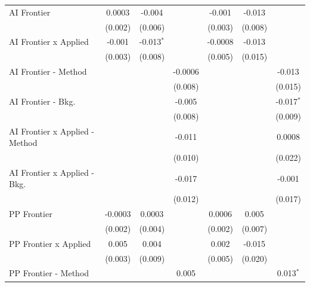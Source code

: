 \begin{tabular}{lcccccc}
   AI Frontier                    & 0.0003      & -0.004       &              & -0.001      & -0.013        &   \\   
                                  & (0.002)     & (0.006)      &              & (0.003)     & (0.008)       &   \\   
   AI Frontier x Applied          & -0.001      & -0.013$^{*}$ &              & -0.0008     & -0.013        &   \\   
                                  & (0.003)     & (0.008)      &              & (0.005)     & (0.015)       &   \\   
   AI Frontier - Method           &             &              & -0.0006      &             &               & -0.013\\   
                                  &             &              & (0.008)      &             &               & (0.015)\\   
   AI Frontier - Bkg.             &             &              & -0.005       &             &               & -0.017$^{*}$\\   
                                  &             &              & (0.008)      &             &               & (0.009)\\   
   AI Frontier x Applied - Method &             &              & -0.011       &             &               & 0.0008\\   
                                  &             &              & (0.010)      &             &               & (0.022)\\   
   AI Frontier x Applied - Bkg.   &             &              & -0.017       &             &               & -0.001\\   
                                  &             &              & (0.012)      &             &               & (0.017)\\   
   PP Frontier                    & -0.0003     & 0.0003       &              & 0.0006      & 0.005         &   \\   
                                  & (0.002)     & (0.004)      &              & (0.002)     & (0.007)       &   \\   
   PP Frontier x Applied          & 0.005       & 0.004        &              & 0.002       & -0.015        &   \\   
                                  & (0.003)     & (0.009)      &              & (0.005)     & (0.020)       &   \\   
   PP Frontier - Method           &             &              & 0.005        &             &               & 0.013$^{*}$\\   

\end{tabular}

